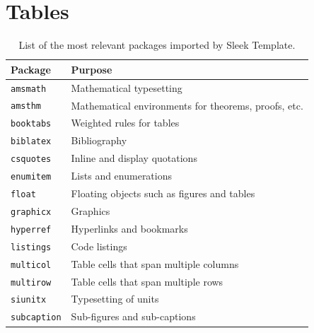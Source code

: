 \documentclass[12pt]{report}
\begin{document}
    \printbibliography

    \appendix

    \chapter{Tables}

    \begin{table}[h]
        \centering
        \begin{tabular}{ll}
            \toprule
            \textbf{Package} & \textbf{Purpose} \\
            \midrule
            \texttt{amsmath} & Mathematical typesetting \\
            \texttt{amsthm} & Mathematical environments for theorems, proofs, etc. \\
            \texttt{booktabs} & Weighted rules for tables \\
            \texttt{biblatex} & Bibliography \\
            \texttt{csquotes} & Inline and display quotations \\
            \texttt{enumitem} & Lists and enumerations \\
            \texttt{float} & Floating objects such as figures and tables \\
            \texttt{graphicx} & Graphics \\
            \texttt{hyperref} & Hyperlinks and bookmarks \\
            \texttt{listings} & Code listings \\
            \texttt{multicol} & Table cells that span multiple columns \\
            \texttt{multirow} & Table cells that span multiple rows \\
            \texttt{siunitx} & Typesetting of units  \\
            \texttt{subcaption} & Sub-figures and sub-captions \\
            \bottomrule
        \end{tabular}
        \caption{List of the most relevant packages imported by Sleek Template.}
        \label{tab:sleek_relevant_packages}
    \end{table}
\end{document}

